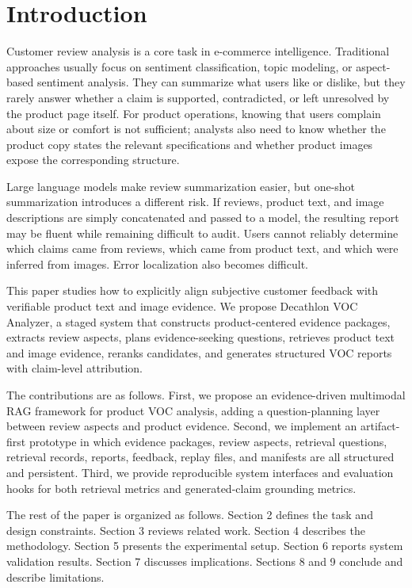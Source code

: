 \documentclass[11pt]{article}
\begin{document}
\section{Introduction}
Customer review analysis is a core task in e-commerce intelligence. Traditional approaches usually focus on sentiment classification, topic modeling, or aspect-based sentiment analysis. They can summarize what users like or dislike, but they rarely answer whether a claim is supported, contradicted, or left unresolved by the product page itself. For product operations, knowing that users complain about size or comfort is not sufficient; analysts also need to know whether the product copy states the relevant specifications and whether product images expose the corresponding structure.

Large language models make review summarization easier, but one-shot summarization introduces a different risk. If reviews, product text, and image descriptions are simply concatenated and passed to a model, the resulting report may be fluent while remaining difficult to audit. Users cannot reliably determine which claims came from reviews, which came from product text, and which were inferred from images. Error localization also becomes difficult.

This paper studies how to explicitly align subjective customer feedback with verifiable product text and image evidence. We propose Decathlon VOC Analyzer, a staged system that constructs product-centered evidence packages, extracts review aspects, plans evidence-seeking questions, retrieves product text and image evidence, reranks candidates, and generates structured VOC reports with claim-level attribution.

The contributions are as follows. First, we propose an evidence-driven multimodal RAG framework for product VOC analysis, adding a question-planning layer between review aspects and product evidence. Second, we implement an artifact-first prototype in which evidence packages, review aspects, retrieval questions, retrieval records, reports, feedback, replay files, and manifests are all structured and persistent. Third, we provide reproducible system interfaces and evaluation hooks for both retrieval metrics and generated-claim grounding metrics.

The rest of the paper is organized as follows. Section 2 defines the task and design constraints. Section 3 reviews related work. Section 4 describes the methodology. Section 5 presents the experimental setup. Section 6 reports system validation results. Section 7 discusses implications. Sections 8 and 9 conclude and describe limitations.
\end{document}
